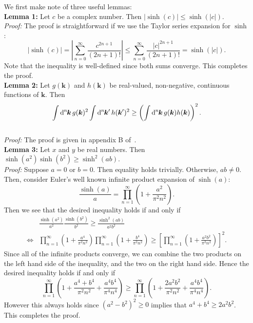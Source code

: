 \documentclass[pra,nofootinbib,floats,aps,twocolumn,tightenlines,superscriptaddress]{revtex4-1}
\renewcommand*\d[2][]{%
	\mathrm{d}%
	\ifx\relax#1\relax\else
	\rule{-0.02em}{1.5ex}^{#1}\rule{0.08em}{0ex}\!
	\fi
	#2\,
}
\begin{document}
We first make note of three useful lemmas:
\vspace{2mm}
\\
\textbf{Lemma 1:} Let $c$ be a complex number. Then $|\sinh(c)|\le \sinh(|c|)$.
\\
\textit{Proof:} The proof is straightforward if we use the Taylor series expansion for $\sinh$:
\begin{equation}
    \left|\sinh(c)\right|=
    \left|\sum_{n=0}^\infty 
    \frac{c^{2n+1}}{(2n+1)!}\right|
    \le
    \sum_{n=0}^\infty
    \frac{|c|^{2n+1}}{(2n+1)!}
    =\sinh\left(|c|\right).
\end{equation}
Note that the inequality is well-defined since both sums converge. This completes the proof.
\vspace{2mm}
\\
\textbf{Lemma 2:} Let $g(\bm k)$ and $h(\bm k)$ be real-valued, non-negative, continuous functions of $\bm{k}$. Then
\begin{equation}
    \int\d[n]{\bm k} g(\bm k)^2
    \int\d[n]{\bm k'} h(\bm k')^2
    \ge 
    \left(
    \int\d[n]{\bm k} g(\bm k) h(\bm k)
    \right)^2.
\end{equation}
\\
\textit{Proof:} The proof is given in appendix B of~\cite{Simidzija2017b}.
\vspace{2mm}
\\
\textbf{Lemma 3:} Let $x$ and $y$ be real numbers. Then $\sinh(a^2)\sinh(b^2)\ge\sinh^2(ab)$.
\\
\textit{Proof:} Suppose $a=0$ or $b=0$. Then equality holds trivially. Otherwise, $ab\neq 0$. Then, consider Euler's well known infinite product expansion of $\sinh(a)$:
\begin{equation}
    \frac{\sinh(a)}{a}
    =
    \prod_{n=1}^{\infty}
    \left(1+\frac{a^2}{\pi^2 n^2}
    \right).
\end{equation}
Then we see that the desired inequality holds if and only if
\begin{align}
    &\frac{\sinh(a^2)}{a^2}
    \frac{\sinh(b^2)}{b^2}
    \ge \frac{\sinh^2(ab)}{a^2 b^2}
    \\
    \iff &
    \prod_{n=1}^{\infty}
    \left(1+\frac{a^4}{\pi^2 n^2}
    \right)
    \prod_{n=1}^{\infty}
    \left(1+\frac{b^4}{\pi^2 n^2}
    \right)
    \ge
    \left[
    \prod_{n=1}^{\infty}
    \left(1+\frac{a^2 b^2}{\pi^2 n^2}
    \right)
    \right]^2.
\end{align}
Since all of the infinite products converge, we can combine the two products on the left hand side of the inequality, and the two on the right hand side. Hence the desired inequality holds if and only if
\begin{equation}
    \prod_{n=1}^{\infty}
    \left(1+\frac{a^4+b^4}{\pi^2 n^2} +\frac{a^4 b^4}{\pi^4 n^4}
    \right)
    \ge
    \prod_{n=1}^{\infty}
    \left(1+\frac{2 a^2 b^2}{\pi^2 n^2} +\frac{a^4 b^4}{\pi^4 n^4}
    \right).
\end{equation}
However this always holds since $(a^2-b^2)^2\ge 0$ implies that $a^4+b^4\ge 2a^2b^2$. This completes the proof.
\vspace{2mm}
\\
\end{document}
